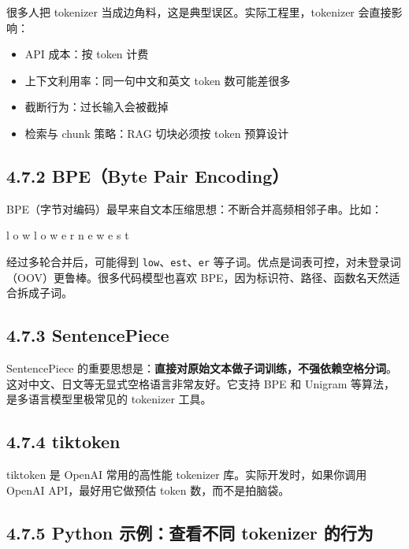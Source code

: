 很多人把 tokenizer 当成边角料，这是典型误区。实际工程里，tokenizer 会直接影响：


\begin{itemize}[leftmargin=2em]
\item API 成本：按 token 计费
\item 上下文利用率：同一句中文和英文 token 数可能差很多
\item 截断行为：过长输入会被截掉
\item 检索与 chunk 策略：RAG 切块必须按 token 预算设计
\end{itemize}

\subsection{4.7.2 BPE（Byte Pair Encoding）}

BPE（字节对编码）最早来自文本压缩思想：不断合并高频相邻子串。比如：


\begin{codeblock}
l o w
l o w e r
n e w e s t
\end{codeblock}

经过多轮合并后，可能得到 \texttt{low}、\texttt{est}、\texttt{er} 等子词。优点是词表可控，对未登录词（OOV）更鲁棒。很多代码模型也喜欢 BPE，因为标识符、路径、函数名天然适合拆成子词。


\subsection{4.7.3 SentencePiece}

SentencePiece 的重要思想是：\textbf{直接对原始文本做子词训练，不强依赖空格分词}。这对中文、日文等无显式空格语言非常友好。它支持 BPE 和 Unigram 等算法，是多语言模型里极常见的 tokenizer 工具。


\subsection{4.7.4 tiktoken}

tiktoken 是 OpenAI 常用的高性能 tokenizer 库。实际开发时，如果你调用 OpenAI API，最好用它做预估 token 数，而不是拍脑袋。


\subsection{4.7.5 Python 示例：查看不同 tokenizer 的行为}

